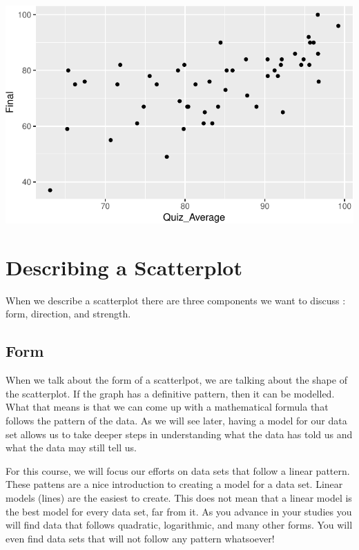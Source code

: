 \documentclass[
  letterpaper,
  DIV=11,
  numbers=noendperiod]{scrreprt}
\begin{document}
\includegraphics{Scatterplots_and_Correlation_files/figure-pdf/unnamed-chunk-4-1.pdf}

\section*{Describing a Scatterplot}\label{describing-a-scatterplot}


When we describe a scatterplot there are three components we want to
discuss : form, direction, and strength.

\subsection*{Form}\label{form}

When we talk about the form of a scatterlpot, we are talking about the
shape of the scatterplot. If the graph has a definitive pattern, then it
can be modelled. What that means is that we can come up with a
mathematical formula that follows the pattern of the data. As we will
see later, having a model for our data set allows us to take deeper
steps in understanding what the data has told us and what the data may
still tell us.

For this course, we will focus our efforts on data sets that follow a
linear pattern. These pattens are a nice introduction to creating a
model for a data set. Linear models (lines) are the easiest to create.
This does not mean that a linear model is the best model for every data
set, far from it. As you advance in your studies you will find data that
follows quadratic, logarithmic, and many other forms. You will even find
data sets that will not follow any pattern whatsoever!
\end{document}

